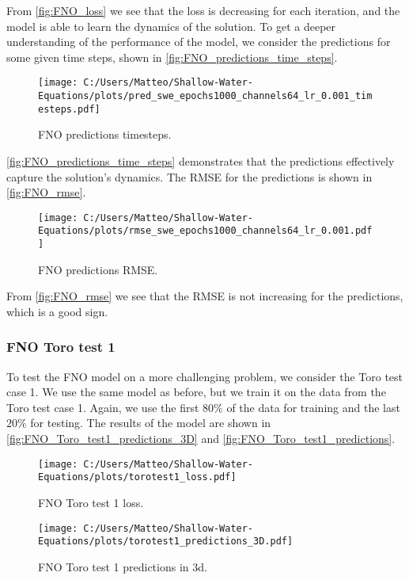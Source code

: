 From \autoref{fig:FNO_loss} we see that the loss is decreasing for each iteration, and the model is able to learn the dynamics of the solution.
To get a deeper understanding of the performance of the model, we consider the predictions for some given time steps, shown in \autoref{fig:FNO_predictions_time_steps}.
\begin{figure}[H]
    \centering
    \texttt{[image: C:/Users/Matteo/Shallow-Water-Equations/plots/pred\_swe\_epochs1000\_channels64\_lr\_0.001\_timesteps.pdf]}
    \caption{FNO predictions timesteps.}\label{fig:FNO_predictions_time_steps}
\end{figure}
\autoref{fig:FNO_predictions_time_steps} demonstrates that the predictions effectively capture the solution's dynamics.
The RMSE for the predictions is shown in \autoref{fig:FNO_rmse}.
\begin{figure}[H]
    \centering
    \texttt{[image: C:/Users/Matteo/Shallow-Water-Equations/plots/rmse\_swe\_epochs1000\_channels64\_lr\_0.001.pdf]}
    \caption{FNO predictions RMSE.}\label{fig:FNO_rmse}
\end{figure}
From \autoref{fig:FNO_rmse} we see that the RMSE is not increasing for the predictions, which is a good sign.


\subsubsection{FNO Toro test 1}
To test the FNO model on a more challenging problem, we consider the Toro test case 1.
We use the same model as before, but we train it on the data from the Toro test case 1.
Again, we use the first $80\%$ of the data for training and the last $20\%$ for testing.
The results of the model are shown in \autoref{fig:FNO_Toro_test1_predictions_3D} and \autoref{fig:FNO_Toro_test1_predictions}.

\begin{figure}[H]
    \centering
    \texttt{[image: C:/Users/Matteo/Shallow-Water-Equations/plots/torotest1\_loss.pdf]}
    \caption{FNO Toro test 1 loss.}\label{fig:FNO_Toro_test1_loss}
\end{figure}

\begin{figure}[H]
    \centering
    \texttt{[image: C:/Users/Matteo/Shallow-Water-Equations/plots/torotest1\_predictions\_3D.pdf]}
    \caption{FNO Toro test 1 predictions in 3d.}\label{fig:FNO_Toro_test1_predictions_3D}
\end{figure}


